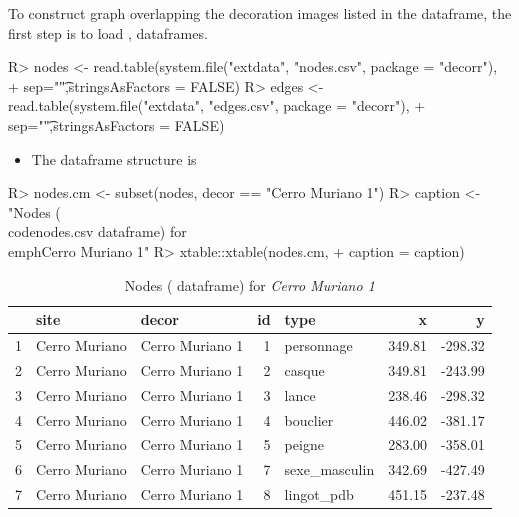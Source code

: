 \documentclass[article]{jss}
\begin{document}
To construct graph overlapping the decoration images listed in the  dataframe, the first step is to load ,  dataframes. 

\begin{Schunk}
\begin{Sinput}
R> nodes <- read.table(system.file("extdata", "nodes.csv", package = "decorr"),
+                      sep="\t",stringsAsFactors = FALSE)
R> edges <- read.table(system.file("extdata", "edges.csv", package = "decorr"),
+                      sep="\t",stringsAsFactors = FALSE)
\end{Sinput}
\end{Schunk}

\begin{itemize}
\item The  dataframe structure is
\end{itemize}

\begin{Schunk}
\begin{Sinput}
R> nodes.cm <- subset(nodes, decor == "Cerro Muriano 1")
R> caption <- "Nodes (\\code{nodes.csv} dataframe) for \\emph{Cerro Muriano 1}"
R> xtable::xtable(nodes.cm,
+         caption = caption)
\end{Sinput}
\begin{table}[ht]
\centering
\begin{tabular}{rllrlrr}
  \hline
 & site & decor & id & type & x & y \\ 
  \hline
1 & Cerro Muriano & Cerro Muriano 1 &   1 & personnage & 349.81 & -298.32 \\ 
  2 & Cerro Muriano & Cerro Muriano 1 &   2 & casque & 349.81 & -243.99 \\ 
  3 & Cerro Muriano & Cerro Muriano 1 &   3 & lance & 238.46 & -298.32 \\ 
  4 & Cerro Muriano & Cerro Muriano 1 &   4 & bouclier & 446.02 & -381.17 \\ 
  5 & Cerro Muriano & Cerro Muriano 1 &   5 & peigne & 283.00 & -358.01 \\ 
  6 & Cerro Muriano & Cerro Muriano 1 &   7 & sexe\_masculin & 342.69 & -427.49 \\ 
  7 & Cerro Muriano & Cerro Muriano 1 &   8 & lingot\_pdb & 451.15 & -237.48 \\ 
   \hline
\end{tabular}
\caption{Nodes ( dataframe) for \emph{Cerro Muriano 1}} 
\end{table}\end{Schunk}
\end{document}
